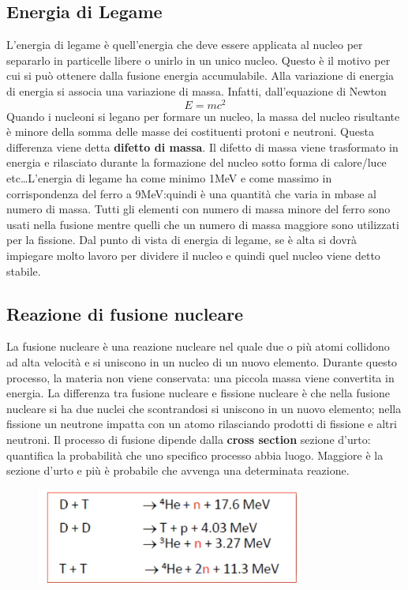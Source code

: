 \documentclass{article}
\begin{document}
\subsection{Energia di Legame}
L'energia di legame è quell'energia che deve essere applicata al nucleo per separarlo in particelle libere o unirlo in un unico nucleo. Questo è il motivo per cui si può ottenere dalla fusione energia accumulabile.\newline
Alla variazione di energia di energia si associa una variazione di massa. Infatti, dall'equazione di Newton\begin{equation*}
	E=mc^{2}
\end{equation*}
Quando i nucleoni si legano per formare un nucleo, la massa del nucleo risultante è minore della somma delle masse dei costituenti protoni e neutroni. Questa differenza viene detta \textbf{difetto di massa}.
Il difetto di massa viene trasformato in energia e rilasciato durante la formazione del nucleo sotto forma di calore/luce etc\dots L'energia di legame ha come minimo 1MeV e come massimo in corrispondenza del ferro a 9MeV:quindi è una quantità che varia in mbase al numero di massa.\newline
Tutti gli elementi con numero di massa minore del ferro sono usati nella fusione mentre quelli che un numero di massa maggiore sono utilizzati per la fissione. Dal punto di vista di energia di legame, se è alta si dovrà impiegare molto lavoro per dividere il nucleo e quindi quel nucleo viene detto stabile.
\subsection{Reazione di fusione nucleare}
La fusione nucleare è una reazione nucleare nel quale due o più atomi collidono ad alta velocità e si uniscono in un nucleo di un nuovo elemento. Durante questo processo, la materia non viene conservata: una piccola massa viene convertita in energia. La differenza tra fusione nucleare e fissione nucleare è che nella fusione nucleare si ha due nuclei che scontrandosi si uniscono in un nuovo elemento; nella fissione un neutrone impatta con un atomo rilasciando prodotti di fissione e altri neutroni. Il processo di fusione dipende dalla \textbf{cross section} sezione d'urto: quantifica la probabilità che uno specifico processo abbia luogo. Maggiore è la sezione d'urto e più è probabile che avvenga una determinata reazione.\newline
\begin{figure}
	\centering
	\includegraphics[scale=0.4]{2022-06-29-11-00-26.png}%
\end{figure}
\end{document}
